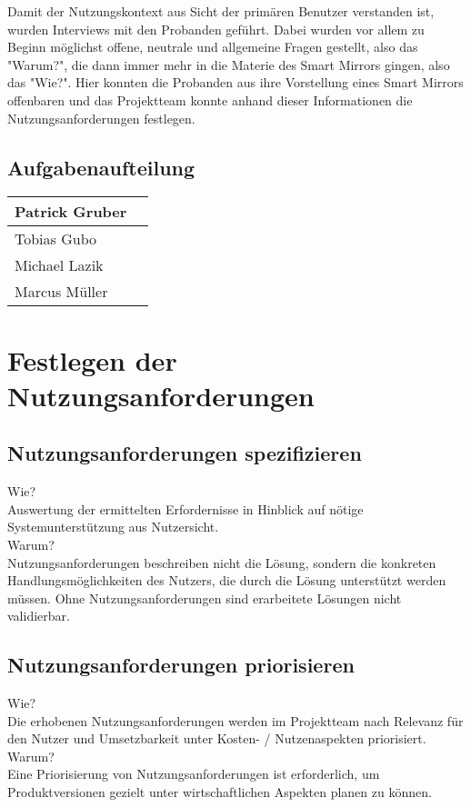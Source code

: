 \documentclass[12pt, a4paper]{scrartcl}
\begin{document}
	Damit der Nutzungskontext aus Sicht der primären Benutzer verstanden ist, wurden Interviews mit den Probanden geführt.
	Dabei wurden vor allem zu Beginn möglichst offene, neutrale und allgemeine Fragen gestellt, also das "Warum?", die dann immer mehr in die Materie des Smart Mirrors gingen, also das "Wie?". Hier konnten die Probanden aus ihre Vorstellung eines Smart Mirrors offenbaren und das Projektteam konnte anhand dieser Informationen die Nutzungsanforderungen festlegen. 
	

	
	
	\subsection*{Aufgabenaufteilung}
	\begin{tabularx}{0.95\textwidth}{|l|X|}
		\hline
		Patrick Gruber & \\
		\hline
		Tobias Gubo & \\
		\hline
		Michael Lazik & \\
		\hline
		Marcus Müller & \\
		\hline
	\end{tabularx}
	
	\newpage
	
	\section{Festlegen der Nutzungsanforderungen}
	\blindtext[1]
	\subsection{Nutzungsanforderungen spezifizieren}
	Wie?\\
	Auswertung der ermittelten Erfordernisse in
	Hinblick auf nötige Systemunterstützung
	aus Nutzersicht.\\
	Warum?\\
	Nutzungsanforderungen beschreiben nicht die Lösung, sondern die konkreten Handlungsmöglichkeiten des Nutzers, die durch die Lösung unterstützt werden müssen. Ohne Nutzungsanforderungen sind erarbeitete Lösungen nicht validierbar.
	\subsection{Nutzungsanforderungen priorisieren}
	Wie?\\
	Die erhobenen Nutzungsanforderungen
	werden im Projektteam nach Relevanz für den Nutzer und Umsetzbarkeit unter Kosten- / Nutzenaspekten priorisiert.\\
	Warum?\\
	Eine Priorisierung von Nutzungsanforderungen ist erforderlich, um Produktversionen gezielt unter wirtschaftlichen Aspekten planen zu können.
	
\end{document}
